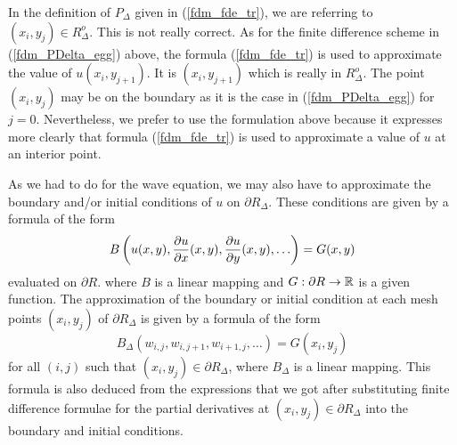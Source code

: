 In the definition of $P_\Delta$ given in (\ref{fdm_fde_tr}), we are
referring to $(x_i,y_j) \in R^o_\Delta$.  This is not really correct.
As for the finite difference scheme in (\ref{fdm_PDelta_egg}) above,
the formula (\ref{fdm_fde_tr}) is used to approximate the value of
$u(x_i,y_{j+1})$.  It is $(x_i,y_{j+1})$ which is really in
$R^o_\Delta$.   The point $(x_i,y_j)$ may be on the boundary as
it is the case in (\ref{fdm_PDelta_egg}) for $j=0$.  Nevertheless,
we prefer to use the formulation above because it expresses more
clearly that formula (\ref{fdm_fde_tr}) is used to approximate a value
of $u$ at an interior point.

As we had to do for the wave equation, we may also have to approximate
the boundary and/or initial conditions of $u$ on $\partial R_\Delta$.
These conditions are given by a formula of the form 
\begin{equation}\label{fdm_pde_tr_bdry}
  B\left(u(x,y), \frac{\partial{u}}{\partial{x}}(x,y), \frac{\partial{u}}{\partial{y}}(x,y), \ldots \right) = G(x,y)
\end{equation}
evaluated on $\partial R$. where $B$ is a linear mapping and
$G:\partial R \to \mathbb{R}$ is a given function.
The approximation of the boundary or initial condition at each mesh
points $(x_i,y_j)$ of $\partial R_\Delta$ is given by
a formula of the form
\begin{equation}\label{fdm_fde_tr_bdry}
  B_\Delta(w_{i,j},w_{i,j+1},w_{i+1,j}, \ldots) = G(x_i,y_j)
\end{equation}
for all $(i,j)$ such that $(x_i,y_j) \in \partial R_\Delta$,
where $B_\Delta$ is a linear mapping.  This formula is also
deduced from the expressions that we got after substituting finite
difference formulae for the partial derivatives at
$(x_i,y_j)\in \partial R_\Delta$ into the boundary and initial conditions.

